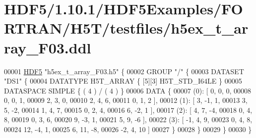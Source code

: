 \hypertarget{_h_d_f5_21_810_81_2_h_d_f5_examples_2_f_o_r_t_r_a_n_2_h5_t_2testfiles_2h5ex__t__array___f03_8ddl_source}{}\section{H\+D\+F5/1.10.1/\+H\+D\+F5\+Examples/\+F\+O\+R\+T\+R\+A\+N/\+H5\+T/testfiles/h5ex\+\_\+t\+\_\+array\+\_\+\+F03.ddl}
\label{_h_d_f5_21_810_81_2_h_d_f5_examples_2_f_o_r_t_r_a_n_2_h5_t_2testfiles_2h5ex__t__array___f03_8ddl_source}

\begin{DoxyCode}
00001 \hyperlink{namespace_h_d_f5}{HDF5} \textcolor{stringliteral}{"h5ex\_t\_array\_F03.h5"} \{
00002 GROUP \textcolor{stringliteral}{"/"} \{
00003    DATASET \textcolor{stringliteral}{"DS1"} \{
00004       DATATYPE  H5T\_ARRAY \{ [5][3] H5T\_STD\_I64LE \}
00005       DATASPACE  SIMPLE \{ ( 4 ) / ( 4 ) \}
00006       DATA \{
00007       (0): [ 0, 0, 0,
00008             0, 0, 1,
00009             2, 3, 0,
00010             2, 4, 6,
00011             0, 1, 2 ],
00012       (1): [ 3, -1, 1,
00013             3, 5, -2,
00014             1, 4, 7,
00015             0, 2, 4,
00016             6, -2, 1 ],
00017       (2): [ 4, 7, -4,
00018             0, 4, 8,
00019             0, 3, 6,
00020             9, -3, 1,
00021             5, 9, -6 ],
00022       (3): [ -1, 4, 9,
00023             0, 4, 8,
00024             12, -4, 1,
00025             6, 11, -8,
00026             -2, 4, 10 ]
00027       \}
00028    \}
00029 \}
00030 \}
\end{DoxyCode}
